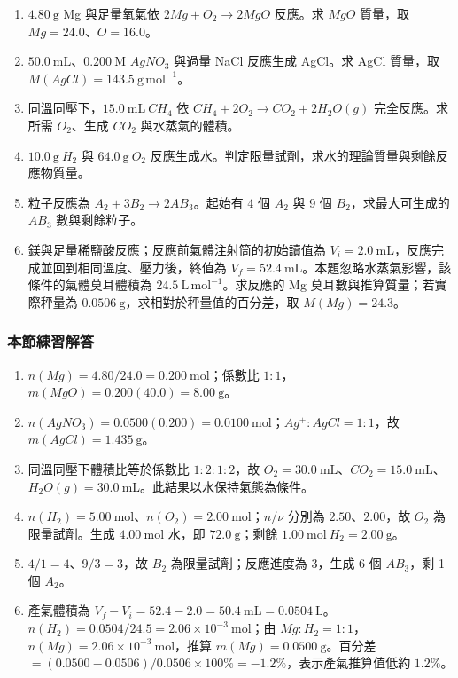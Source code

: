 \documentclass[11pt,a4paper]{article}
\providecommand{\tightlist}{%
  \setlength{\itemsep}{0pt}\setlength{\parskip}{0pt}}
\begin{document}
\begin{enumerate}
\def\labelenumi{\arabic{enumi}.}
\tightlist
\item
  \(4.80\ \mathrm g\) Mg 與足量氧氣依 \(2Mg+O_2\rightarrow2MgO\) 反應。求 \(MgO\) 質量，取 \(Mg=24.0\)、\(O=16.0\)。
\item
  \(50.0\ \mathrm{mL}\)、\(0.200\ \mathrm M\) \(AgNO_3\) 與過量 NaCl 反應生成 AgCl。求 AgCl 質量，取 \(M(AgCl)=143.5\ \mathrm{g\,mol^{-1}}\)。
\item
  同溫同壓下，\(15.0\ \mathrm{mL}\ CH_4\) 依 \(CH_4+2O_2\rightarrow CO_2+2H_2O(g)\) 完全反應。求所需 \(O_2\)、生成 \(CO_2\) 與水蒸氣的體積。
\item
  \(10.0\ \mathrm g\ H_2\) 與 \(64.0\ \mathrm g\ O_2\) 反應生成水。判定限量試劑，求水的理論質量與剩餘反應物質量。
\item
  粒子反應為 \(A_2+3B_2\rightarrow2AB_3\)。起始有 4 個 \(A_2\) 與 9 個 \(B_2\)，求最大可生成的 \(AB_3\) 數與剩餘粒子。
\item
  鎂與足量稀鹽酸反應；反應前氣體注射筒的初始讀值為 \(V_i=2.0\ \mathrm{mL}\)，反應完成並回到相同溫度、壓力後，終值為 \(V_f=52.4\ \mathrm{mL}\)。本題忽略水蒸氣影響，該條件的氣體莫耳體積為 \(24.5\ \mathrm{L\,mol^{-1}}\)。求反應的 Mg 莫耳數與推算質量；若實際秤量為 \(0.0506\ \mathrm g\)，求相對於秤量值的百分差，取 \(M(Mg)=24.3\)。
\end{enumerate}

\subsubsection{本節練習解答}\label{ux672cux7bc0ux7df4ux7fd2ux89e3ux7b54-2}

\begin{enumerate}
\def\labelenumi{\arabic{enumi}.}
\tightlist
\item
  \(n(Mg)=4.80/24.0=0.200\ \mathrm{mol}\)；係數比 \(1:1\)，\(m(MgO)=0.200(40.0)=8.00\ \mathrm g\)。
\item
  \(n(AgNO_3)=0.0500(0.200)=0.0100\ \mathrm{mol}\)；\(Ag^+:AgCl=1:1\)，故 \(m(AgCl)=1.435\ \mathrm g\)。
\item
  同溫同壓下體積比等於係數比 \(1:2:1:2\)，故 \(O_2=30.0\ \mathrm{mL}\)、\(CO_2=15.0\ \mathrm{mL}\)、\(H_2O(g)=30.0\ \mathrm{mL}\)。此結果以水保持氣態為條件。
\item
  \(n(H_2)=5.00\ \mathrm{mol}\)、\(n(O_2)=2.00\ \mathrm{mol}\)；\(n/\nu\) 分別為 \(2.50\)、\(2.00\)，故 \(O_2\) 為限量試劑。生成 \(4.00\ \mathrm{mol}\) 水，即 \(72.0\ \mathrm g\)；剩餘 \(1.00\ \mathrm{mol}\ H_2=2.00\ \mathrm g\)。
\item
  \(4/1=4\)、\(9/3=3\)，故 \(B_2\) 為限量試劑；反應進度為 3，生成 6 個 \(AB_3\)，剩 1 個 \(A_2\)。
\item
  產氣體積為 \(V_f-V_i=52.4-2.0=50.4\ \mathrm{mL}=0.0504\ \mathrm L\)。\(n(H_2)=0.0504/24.5=2.06\times10^{-3}\ \mathrm{mol}\)；由 \(Mg:H_2=1:1\)，\(n(Mg)=2.06\times10^{-3}\ \mathrm{mol}\)，推算 \(m(Mg)=0.0500\ \mathrm g\)。百分差 \(=(0.0500-0.0506)/0.0506\times100\%=-1.2\%\)，表示產氣推算值低約 \(1.2\%\)。
\end{enumerate}
\end{document}
